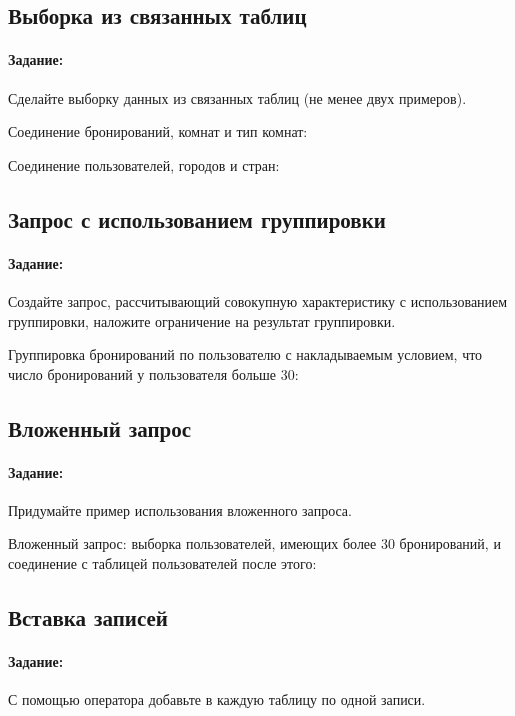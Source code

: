 \newpage

\subsection{Выборка из связанных таблиц}

\paragraph{Задание:} Сделайте выборку данных из связанных таблиц (не менее двух примеров).

Соединение бронирований, комнат и тип комнат:

Соединение пользователей, городов и стран:

\newpage

\subsection{Запрос с использованием группировки}

\paragraph{Задание:} Создайте запрос, рассчитывающий совокупную характеристику с использованием группировки, наложите ограничение на результат группировки.

Группировка бронирований по пользователю с накладываемым условием, что число бронирований у пользователя больше 30:

\subsection{Вложенный запрос}

\paragraph{Задание:} Придумайте пример использования вложенного запроса.

Вложенный запрос: выборка пользователей, имеющих более 30 бронирований, и соединение с таблицей пользователей после этого:

\subsection{Вставка записей}

\paragraph{Задание:} С помощью оператора  добавьте в каждую таблицу по одной записи.


